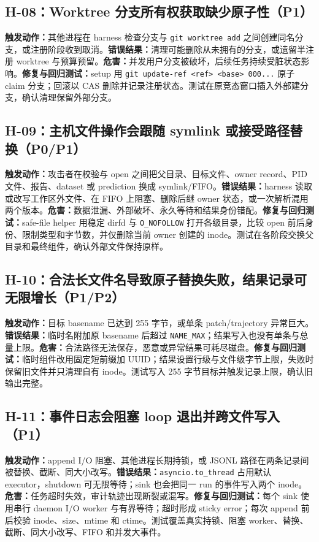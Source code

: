 \documentclass[11pt,a4paper,fontset=fandol]{ctexart}
\newcommand{\code}[1]{\texttt{#1}}
\begin{document}
\subsection{H-08：Worktree 分支所有权获取缺少原子性（P1）}

\textbf{触发动作：}其他进程在 harness 检查分支与 \code{git worktree add} 之间创建同名分支，或注册阶段收到取消。\textbf{错误结果：}清理可能删除从未拥有的分支，或遗留半注册 worktree 与预算预留。\textbf{危害：}并发用户分支被破坏，后续任务持续受脏状态影响。\textbf{修复与回归测试：}setup 用 \code{git update-ref <ref> <base> 000...} 原子 claim 分支；回滚以 CAS 删除并记录注册状态。测试在原竞态窗口插入外部建分支，确认清理保留外部分支。

\subsection{H-09：主机文件操作会跟随 symlink 或接受路径替换（P0/P1）}

\textbf{触发动作：}攻击者在校验与 open 之间把父目录、目标文件、owner record、PID 文件、报告、dataset 或 prediction 换成 symlink/FIFO。\textbf{错误结果：}harness 读取或改写工作区外文件、在 FIFO 上阻塞、删除后继 owner 状态，或一次解析混用两个版本。\textbf{危害：}数据泄漏、外部破坏、永久等待和结果身份错配。\textbf{修复与回归测试：}safe-file helper 用稳定 dirfd 与 \code{O\_NOFOLLOW} 打开各级目录，比较 open 前后身份、限制类型和字节数，并仅删除当前 owner 创建的 inode。测试在各阶段交换父目录和最终组件，确认外部文件保持原样。

\subsection{H-10：合法长文件名导致原子替换失败，结果记录可无限增长（P1/P2）}

\textbf{触发动作：}目标 basename 已达到 255 字节，或单条 patch/trajectory 异常巨大。\textbf{错误结果：}临时名附加原 basename 后超过 \code{NAME\_MAX}；结果写入也没有单条与总量上限。\textbf{危害：}合法路径无法保存，恶意或异常结果可耗尽磁盘。\textbf{修复与回归测试：}临时组件改用固定短前缀加 UUID；结果设置行级与文件级字节上限，失败时保留旧文件并只清理自有 inode。测试写入 255 字节目标并触发记录上限，确认旧输出完整。

\subsection{H-11：事件日志会阻塞 loop 退出并跨文件写入（P1）}

\textbf{触发动作：}append I/O 阻塞、其他进程长期持锁，或 JSONL 路径在两条记录间被替换、截断、同大小改写。\textbf{错误结果：}\code{asyncio.to\_thread} 占用默认 executor，shutdown 可无限等待；sink 也会把同一 run 的事件写入两个 inode。\textbf{危害：}任务超时失效，审计轨迹出现断裂或混写。\textbf{修复与回归测试：}每个 sink 使用串行 daemon I/O worker 与有界等待；超时形成 sticky error；每次 append 前后校验 inode、size、mtime 和 ctime。测试覆盖真实持锁、阻塞 worker、替换、截断、同大小改写、FIFO 和并发大事件。
\end{document}
